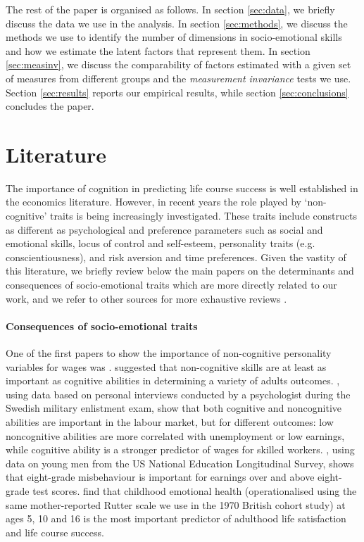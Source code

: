 The rest of the paper is organised as follows. In section \ref{sec:data}, we briefly discuss the data we use in the analysis. In section \ref{sec:methods}, we discuss the methods we use to identify the number of dimensions in socio-emotional skills and how we estimate the latent factors that represent them. In section \ref{sec:measinv}, we discuss the comparability of factors estimated with a given set of measures from different groups and the \emph{measurement invariance} tests we use. Section \ref{sec:results} reports our empirical results, while section \ref{sec:conclusions} concludes the paper.


\section{Literature \label{sec:lit}}

The importance of cognition in predicting life course success is well established in the economics literature. However, in recent years the role played by `non-cognitive' traits is being increasingly investigated. These traits include constructs as different as psychological and preference parameters such as social and emotional skills, locus of control and self-esteem, personality traits (e.g. conscientiousness), and risk aversion and time preferences. Given the vastity of this literature, we briefly review below the main papers on the determinants and consequences of socio-emotional traits which are more directly related to our work, and we refer to other sources for more exhaustive reviews \citep{Borghans2008,Almlund2011,Goodman2015,Kautz2014}.

\paragraph{Consequences of socio-emotional traits} One of the first papers to show the importance of non-cognitive personality variables for wages was \cite{Bowles2001}. \cite{Heckman2006} suggested that non-cognitive skills are at least as important as cognitive abilities in determining a variety of adults outcomes. \citet{Lindqvist2011}, using data based on personal interviews conducted by a psychologist during the Swedish military enlistment exam, show that both cognitive and noncognitive abilities are important in the labour market, but for different outcomes: low noncognitive abilities are more correlated with unemployment or low earnings, while cognitive ability is a stronger predictor of wages for skilled workers. \citet{Segal2013}, using data on young men from the US National Education Longitudinal Survey, shows that eight-grade misbehaviour is important for earnings over and above eight-grade test scores. \citet{Layard2014} find that childhood emotional health (operationalised using the same mother-reported Rutter scale we use in the 1970 British cohort study) at ages 5, 10 and 16 is the most important predictor of adulthood life satisfaction and life course success.


